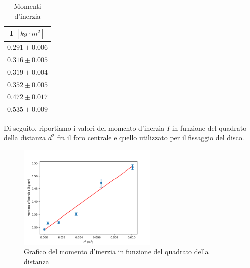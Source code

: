 \begin{table}[H]
	\centering
	\begin{tabular}{|c|}
		\hline
		\textbf{I $[kg \cdot m^2]$} \\
		\hline
		$0.291\pm 0.006$ \\
		$0.316\pm 0.005$ \\
		$0.319\pm 0.004$ \\
		$0.352\pm 0.005$ \\
		$0.472\pm 0.017$ \\
            $0.535 \pm 0.009$ \\
		\hline
	\end{tabular}
	\caption{Momenti d'inerzia}
	\label{tab:}
\end{table}

Di seguito, riportiamo i valori del momento d'inerzia $I$ in funzione del quadrato della distanza $d^2$ fra il foro centrale e quello utilizzato per il fissaggio del disco. 

\begin{figure}[H]
    \centering
    \includegraphics[width=0.6\textwidth]{figures/graph_2.png}
    \caption{Grafico del momento d'inerzia in funzione del quadrato della distanza}
    \label{fig:etichetta}
\end{figure}